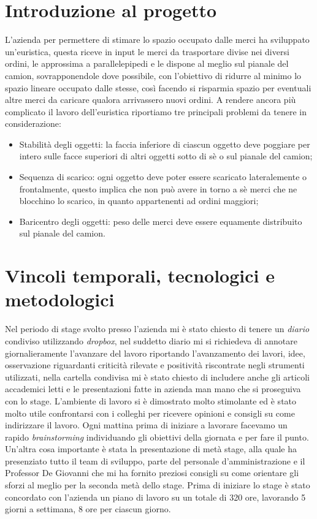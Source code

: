 \section{Introduzione al progetto}
L'azienda per permettere di stimare lo spazio occupato dalle merci ha sviluppato un'euristica, questa riceve in input le merci da trasportare divise nei diversi ordini, le approssima a parallelepipedi e le dispone al meglio sul pianale del camion, sovrapponendole dove possibile, con l'obiettivo di ridurre al minimo lo spazio lineare occupato dalle stesse, così facendo si risparmia spazio per eventuali altre merci da caricare qualora arrivassero nuovi ordini.
A rendere ancora più complicato il lavoro dell'euristica riportiamo tre principali problemi da tenere in considerazione:
\begin{itemize}
	\item Stabilità degli oggetti: la faccia inferiore di ciascun oggetto deve poggiare per intero sulle facce superiori di altri oggetti sotto di sè o sul pianale del camion;
	\item Sequenza di scarico: ogni oggetto deve poter essere scaricato lateralemente o frontalmente, questo implica che non può avere in torno a sè merci che ne blocchino lo scarico, in quanto appartenenti ad ordini maggiori;
	\item Baricentro degli oggetti: peso delle merci deve essere equamente distribuito sul pianale del camion.
\end{itemize}

\section{Vincoli temporali, tecnologici e metodologici}
Nel periodo di stage svolto presso l'azienda mi è stato chiesto di tenere un \textit{diario} condiviso utilizzando \textit{dropbox}, nel suddetto diario mi si richiedeva di annotare giornalieramente l'avanzare del lavoro riportando l'avanzamento dei lavori, idee, osservazione riguardanti criticità rilevate e positività riscontrate negli strumenti utilizzati, nella cartella condivisa mi è stato chiesto di includere anche gli articoli accademici letti e le presentazioni fatte in azienda man mano che si proseguiva con lo stage. L'ambiente di lavoro si è dimostrato molto stimolante ed è stato molto utile confrontarsi con i colleghi per ricevere opinioni e consigli su come indirizzare il lavoro. Ogni mattina prima di iniziare a lavorare facevamo un rapido \textit{brainstorming} individuando gli obiettivi della giornata e per fare il punto.
Un'altra cosa importante è stata la presentazione di metà stage, alla quale ha presenziato tutto il team di sviluppo, parte del personale d'amministrazione e il Professor De Giovanni che mi ha fornito preziosi consigli su come orientare gli sforzi al meglio per la seconda metà dello stage.
Prima di iniziare lo stage è stato concordato con l'azienda un piano di lavoro su un totale di 320 ore, lavorando 5 giorni a settimana, 8 ore per ciascun giorno. 

